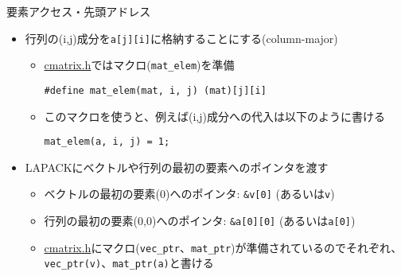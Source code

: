 \begin{frame}[t,fragile]{要素アクセス・先頭アドレス}
  \begin{itemize}
  \item 行列の(i,j)成分を\verb+a[j][i]+に格納することにする(column-major)
    \begin{itemize}
      \item \href{https://github.com/todo-group/computer-experiments/blob/master/exercise/include/cmatrix.h}{cmatrix.h}ではマクロ(\verb+mat_elem+)を準備
\begin{lstlisting}
#define mat_elem(mat, i, j) (mat)[j][i]
\end{lstlisting}
\item このマクロを使うと、例えば(i,j)成分への代入は以下のように書ける
\begin{lstlisting}
mat_elem(a, i, j) = 1;
\end{lstlisting}
\end{itemize}
  \item LAPACKにベクトルや行列の最初の要素へのポインタを渡す
    \begin{itemize}
      \item ベクトルの最初の要素(0)へのポインタ: \verb+&v[0]+ (あるいは\verb+v+)
      \item 行列の最初の要素(0,0)へのポインタ: \verb+&a[0][0]+ (あるいは\verb+a[0]+)
      \item \href{https://github.com/todo-group/computer-experiments/blob/master/exercise/include/cmatrix.h}{cmatrix.h}にマクロ({\tt vec\_ptr}、{\tt mat\_ptr})が準備されているのでそれぞれ、{\tt vec\_ptr(v)}、{\tt mat\_ptr(a)}と書ける
    \end{itemize}
  \end{itemize}
\end{frame}
